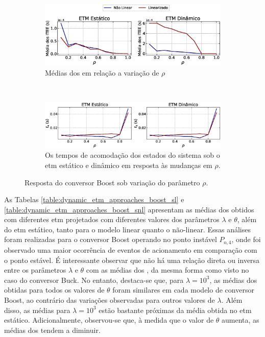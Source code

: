 \begin{figure}[H]
  \centering
  \captionsetup{justification=centering}
  \begin{subfigure}{1.\textwidth}
    \centering
    \includegraphics[width=1.\textwidth]{figuras/boost/itee-mean.eps}
    \caption{Médias dos  em relação a variação de $\rho$}
  \end{subfigure}
  \\[6pt]
  \begin{subfigure}{1.\textwidth} 
    \centering
    \includegraphics[width=1.\textwidth]{figuras/boost/ts.eps}
    \caption{Os tempos de acomodação dos estados do sistema sob o \acrshort{etm} estático e dinâmico em resposta às mudanças em $\rho$.}
  \end{subfigure}
  \caption{Resposta do conversor Boost sob variação do parâmetro $\rho$.}
  \label{fig:boost_converter_mu}
\end{figure}

As Tabelas \ref{table:dynamic_etm_approaches_boost_sl} e \ref{table:dynamic_etm_approaches_boost_snl} apresentam as médias dos  obtidos com diferentes \acrshort{etm} projetados com diferentes valores dos parâmetros $\lambda$ e $\theta$, além do \acrshort{etm} estático, tanto para o modelo linear quanto o não-linear. Essas análises foram realizadas para o conversor Boost operando no ponto instável $P_{\mathrm{o}, 4}$, onde foi observado uma maior ocorrência de eventos de acionamento em comparação com o ponto estável. É interessante observar que não há uma relação direta ou inversa entre os parâmetros $\lambda$ e $\theta$ com as médias dos , da mesma forma como visto no caso do conversor Buck. No entanto, destaca-se que, para $\lambda = 10^3$, as médias dos  obtidas para todos os valores de $\theta$ foram similares em cada modelo de conversor Boost, ao contrário das variações observadas para outros valores de $\lambda$. Além disso, as médias para $\lambda = 10^3$ estão bastante próximas da média obtida no \acrshort{etm} estático. Adicionalmente, observou-se que, à medida que o valor de $\theta$ aumenta, as médias dos  tendem a diminuir.

